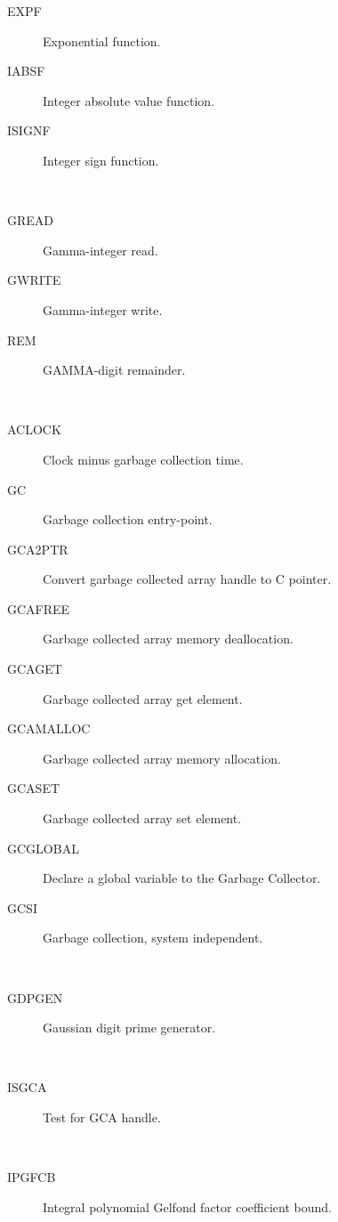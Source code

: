 \begin{description}
\begin{description}
  \item[EXPF]  Exponential function.
  \item[IABSF]  Integer absolute value function.
  \item[ISIGNF]  Integer sign function.
  \end{description}
\item[gamma] \ \ 
  \begin{description}
  \item[GREAD]  Gamma-integer read.
  \item[GWRITE]  Gamma-integer write.
  \item[REM]  GAMMA-digit remainder.
  \end{description}
\item[garbage] \ \ 
  \begin{description}
  \item[ACLOCK]  Clock minus garbage collection time.
  \item[GC]  Garbage collection entry-point.
  \item[GCA2PTR]  Convert garbage collected array handle to C pointer.
  \item[GCAFREE]  Garbage collected array memory deallocation.
  \item[GCAGET]  Garbage collected array get element.
  \item[GCAMALLOC]  Garbage collected array memory allocation.
  \item[GCASET]  Garbage collected array set element.
  \item[GCGLOBAL]  Declare a global variable to the Garbage Collector.
  \item[GCSI]  Garbage collection, system independent.
  \end{description}
\item[gaussian] \ \ 
  \begin{description}
  \item[GDPGEN]  Gaussian digit prime generator.
  \end{description}
\item[gca] \ \ 
  \begin{description}
  \item[ISGCA]  Test for GCA handle.
  \end{description}
\item[gelfond] \ \ 
  \begin{description}
  \item[IPGFCB]  Integral polynomial Gelfond factor coefficient bound.
  \end{description}

\end{description}
